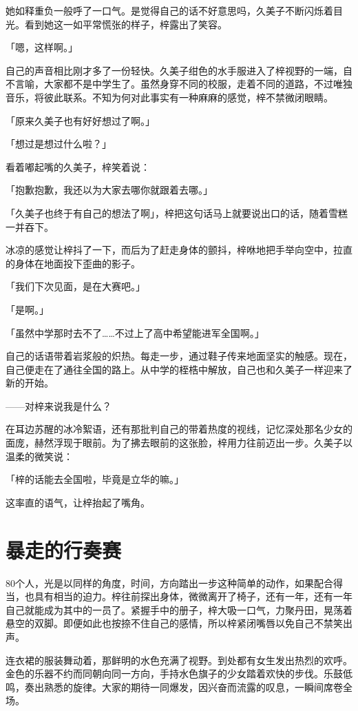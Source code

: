 \documentclass[UTF8]{ctexart}
\begin{document}
    她如释重负一般呼了一口气。是觉得自己的话不好意思吗，久美子不断闪烁着目光。看到她这一如平常慌张的样子，梓露出了笑容。

    「嗯，这样啊。」

    自己的声音相比刚才多了一份轻快。久美子绀色的水手服进入了梓视野的一端，自不言喻，大家都不是中学生了。虽然身穿不同的校服，走着不同的道路，不过唯独音乐，将彼此联系。不知为何对此事实有一种麻麻的感觉，梓不禁微闭眼睛。

    「原来久美子也有好好想过了啊。」

    「想过是想过什么啦？」

    看着嘟起嘴的久美子，梓笑着说：

    「抱歉抱歉，我还以为大家去哪你就跟着去哪。」

    「久美子也终于有自己的想法了啊」，梓把这句话马上就要说出口的话，随着雪糕一并吞下。

    冰凉的感觉让梓抖了一下，而后为了赶走身体的颤抖，梓咻地把手举向空中，拉直的身体在地面投下歪曲的影子。

    「我们下次见面，是在大赛吧。」

    「是啊。」

    「虽然中学那时去不了……不过上了高中希望能进军全国啊。」

    自己的话语带着岩浆般的炽热。每走一步，通过鞋子传来地面坚实的触感。现在，自己便走在了通往全国的路上。从中学的桎梏中解放，自己也和久美子一样迎来了新的开始。

    ——对梓来说我是什么？

    在耳边苏醒的冰冷絮语，还有那批判自己的带着热度的视线，记忆深处那名少女的面庞，赫然浮现于眼前。为了拂去眼前的这张脸，梓用力往前迈出一步。久美子以温柔的微笑说：

    「梓的话能去全国啦，毕竟是立华的嘛。」

    这率直的语气，让梓抬起了嘴角。
    \section{暴走的行奏赛}

    80个人，光是以同样的角度，时间，方向踏出一步这种简单的动作，如果配合得当，也具有相当的迫力。梓往前探出身体，微微离开了椅子，还有一年，还有一年自己就能成为其中的一员了。紧握手中的册子，梓大吸一口气，力聚丹田，晃荡着悬空的双脚。即便如此也按捺不住自己的感情，所以梓紧闭嘴唇以免自己不禁笑出声。

    连衣裙的服装舞动着，那鲜明的水色充满了视野。到处都有女生发出热烈的欢呼。金色的乐器不约而同朝向同一方向，手持水色旗子的少女踏着欢快的步伐。乐鼓低鸣，奏出熟悉的旋律。大家的期待一同爆发，因兴奋而流露的叹息，一瞬间席卷全场。
\end{document}
